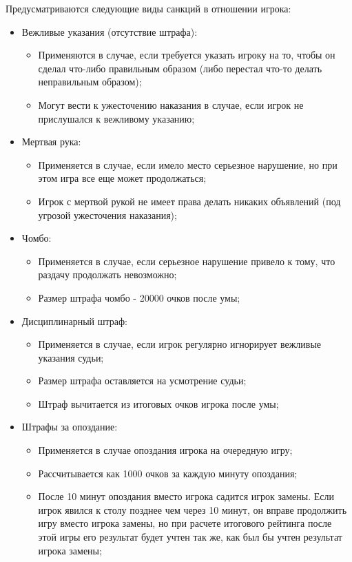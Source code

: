 Предусматриваются следующие виды санкций в отношении игрока:
\begin{itemize}
	\item Вежливые указания (отсутствие штрафа):
	\begin{itemize}
		\item Применяются в случае, если требуется указать игроку на то, чтобы он сделал что-либо правильным образом (либо перестал что-то делать неправильным образом);
		\item Могут вести к ужесточению наказания в случае, если игрок не прислушался к вежливому указанию;
	\end{itemize}
	\item Мертвая рука:
	\begin{itemize}
		\item Применяется в случае, если имело место серьезное нарушение, но при этом игра все еще может продолжаться;
		\item Игрок с мертвой рукой не имеет права делать никаких объявлений (под угрозой ужесточения наказания);
	\end{itemize}
	\item Чомбо:
	\begin{itemize}
		\item Применяется в случае, если серьезное нарушение привело к тому, что раздачу продолжать невозможно;
		\item Размер штрафа чомбо - 20000 очков после умы;
	\end{itemize}
	\item Дисциплинарный штраф:
	\begin{itemize}
		\item Применяется в случае, если игрок регулярно игнорирует вежливые указания судьи;
		\item Размер штрафа оставляется на усмотрение судьи;
		\item Штраф вычитается из итоговых очков игрока после умы;
	\end{itemize}
	\item Штрафы за опоздание:
	\begin{itemize}
		\item Применяется в случае опоздания игрока на очередную игру;
		\item Рассчитывается как 1000 очков за каждую минуту опоздания;
		\item После 10 минут опоздания вместо игрока садится игрок замены. Если игрок явился к столу позднее чем через 10 минут, он вправе продолжить игру вместо игрока замены, но при расчете итогового рейтинга после этой игры его результат будет учтен так же, как был бы учтен результат игрока замены;

\end{itemize}
\end{itemize}
